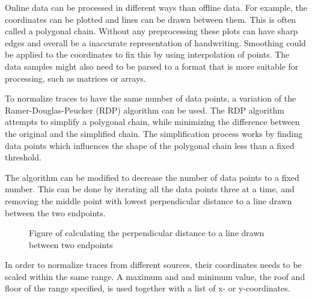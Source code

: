 Online data can be processed in different ways than offline data. For example, the coordinates can be plotted and lines can be drawn between them. This is often called a polygonal chain. Without any preprocessing these plots can have sharp edges and overall be a inaccurate representation of handwriting. Smoothing could be applied to the coordinates to fix this by using interpolation of points. The data samples might also need to be parsed to a format that is more suitable for processing, such as matrices or arrays.

To normalize traces to have the same number of data points, a variation of the Ramer-Douglas-Peucker (RDP)\cite{h_algorithms_2011} algorithm can be used. The RDP algorithm attempts to simplify a polygonal chain, while minimizing the difference between the original and the simplified chain. The simplification process works by finding data points which influences the shape of the polygonal chain less than a fixed threshold.

The algorithm can be modified to decrease the number of data points to a fixed number. This can be done by iterating all the data points three at a time, and removing the middle point with lowest perpendicular distance to a line drawn between the two endpoints.

\begin{figure}[H]
    \centering
    \caption{Figure of calculating the perpendicular distance to a line drawn between two endpoints}
    \label{fig:my_label}
\end{figure}
\label{ramer_douglas_peucker}

In order to normalize traces from different sources, their coordinates needs to be scaled within the same range. A maximum and and minimum value, the roof and floor of the range specified, is used together with a list of x- or y-coordinates.

